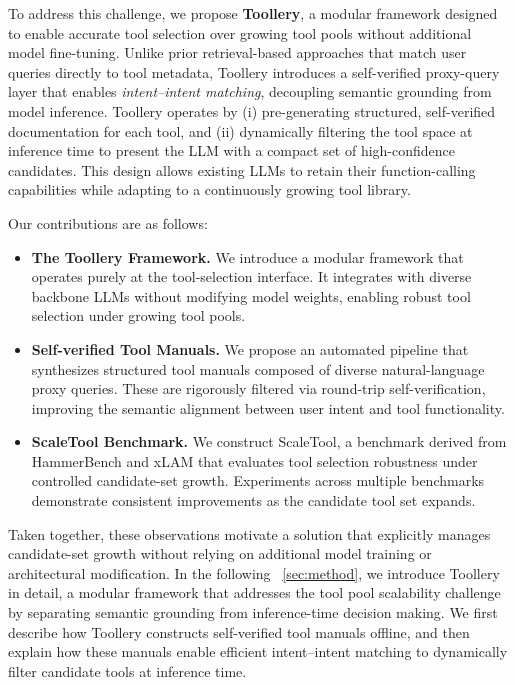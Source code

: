 \documentclass[11pt]{article}
\begin{document}
To address this challenge, we propose \textbf{Toollery}, a modular framework designed to enable accurate tool selection over growing tool pools without additional model fine-tuning. Unlike prior retrieval-based approaches that match user queries directly to tool metadata, Toollery introduces a self-verified proxy-query layer that enables \textit{intent--intent matching}, decoupling semantic grounding from model inference. Toollery operates by (i) pre-generating structured, self-verified documentation for each tool, and (ii) dynamically filtering the tool space at inference time to present the LLM with a compact set of high-confidence candidates. This design allows existing LLMs to retain their function-calling capabilities while adapting to a continuously growing tool library.


Our contributions are as follows:
\begin{itemize}
    \item \textbf{The Toollery Framework.} We introduce a modular framework that operates purely at the tool-selection interface. It integrates with diverse backbone LLMs without modifying model weights, enabling robust tool selection under growing tool pools.
    \item \textbf{Self-verified Tool Manuals.} We propose an automated pipeline that synthesizes structured tool manuals composed of diverse natural-language proxy queries. These are rigorously filtered via round-trip self-verification, improving the semantic alignment between user intent and tool functionality.
    \item \textbf{ScaleTool Benchmark.} We construct ScaleTool, a benchmark derived from HammerBench \cite{wang2025hammerbench} and xLAM \cite{liu2024apigen} that evaluates tool selection robustness under controlled candidate-set growth. Experiments across multiple benchmarks demonstrate consistent improvements as the candidate tool set expands.
\end{itemize}


Taken together, these observations motivate a solution that explicitly manages candidate-set growth without relying on additional model training or architectural modification. In the following ~\ref{sec:method}, we introduce Toollery in detail, a modular framework that addresses the tool pool scalability challenge by separating semantic grounding from inference-time decision making. We first describe how Toollery constructs self-verified tool manuals offline, and then explain how these manuals enable efficient intent--intent matching to dynamically filter candidate tools at inference time.
\end{document}
